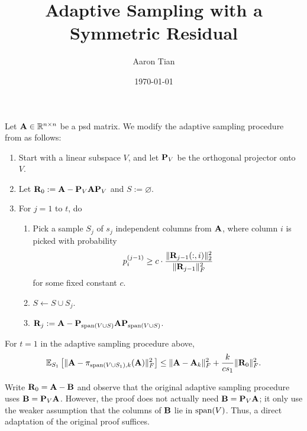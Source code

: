 \documentclass{article}
\title{Adaptive Sampling with a Symmetric Residual}
\author{Aaron Tian}
\date{\today}
\begin{document}
% 
\maketitle

Let $\mathbf{A}\in \mathbb{R}^{n\times n}$ be a psd matrix. We modify the adaptive sampling procedure from \cite{deshpande_adaptive_2006} as follows:


\begin{enumerate}
    \item Start with a linear subspace $V$, and let $\mathbf{P}_V$ be the orthogonal projector onto $V$.
    \item Let $\mathbf{R}_0 := \mathbf{A} - \mathbf{P}_V\mathbf{A}\mathbf{P}_V$ and $S := \varnothing$.
    \item For $j = 1$ to $t$, do
    \begin{enumerate}
        \item Pick a sample $S_j$ of $s_j$ independent columns from $\mathbf{A}$, where column $i$ is picked with probability 
        \[p_i^{(j-1)}\geq c\cdot \frac{\|\mathbf{R}_{j-1}(:, i)\|^2_2}{\|\mathbf{R}_{j-1}\|^2_F}\]
        for some fixed constant $c$.
        \item $S\gets S\cup S_j$.
        \item $\mathbf{R}_{j} := \mathbf{A} - \mathbf{P}_{\operatorname*{span}(V\cup S)}\mathbf{A}\mathbf{P}_{\operatorname*{span}(V\cup S)}$.
    \end{enumerate}
\end{enumerate}

\begin{theorem}
    \label{thm:adaptive-sampling}
    For $t = 1$ in the adaptive sampling procedure above,
    \[\mathbb{E}_{S_1}\left[\|\mathbf{A} - \pi_{\operatorname*{span}(V\cup S_1), k}(\mathbf{A})\|^2_F\right]\leq \|\mathbf{A} - \mathbf{A}_k\|^2_F + \frac{k}{cs_1}\|\mathbf{R}_0\|^2_F.\]
\end{theorem}

Write $\mathbf{R}_0 = \mathbf{A} - \mathbf{B}$ and observe that the original adaptive sampling procedure uses $\mathbf{B} = \mathbf{P}_V\mathbf{A}$. However, the proof does not actually need $\mathbf{B} = \mathbf{P}_V\mathbf{A}$; it only use the weaker assumption that the columns of $\mathbf{B}$ lie in $\operatorname*{span}(V)$. Thus, a direct adaptation of the original proof suffices.
\end{document}
